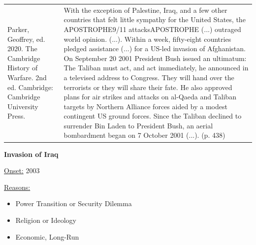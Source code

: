{\begin{longtable}{p{}p{}}
\\
Parker, Geoffrey, ed. 2020. The Cambridge History of Warfare. 2nd ed. Cambridge: Cambridge University Press. & With the exception of Palestine, Iraq, and a few other countries that felt little sympathy for the United States, the APOSTROPHE9/11 attacksAPOSTROPHE (...) outraged world opinion. (...). Within a week, fifty-eight countries pledged assistance (...) for a US-led invasion of Afghanistan. On September 20 2001 President Bush issued an ultimatum: The Taliban must act, and act immediately, he announced in a televised address to Congress. They will hand over the terrorists or they will share their fate. He also approved plans for air strikes and attacks on al-Qaeda and Taliban targets by Northern Alliance forces aided by a modest contingent US ground forces. Since the Taliban declined to surrender Bin Laden to President Bush, an aerial bombardment began on 7 October 2001 (...). (p. 438)
\\
\end{longtable}}
\clearpage
         \textbf{Invasion of Iraq} 

          \underline{Onset:} 2003         

\underline{Reasons:}
\begin{itemize}
\item Power Transition or Security Dilemma
\item Religion or Ideology
\item Economic, Long-Run
\end{itemize}

